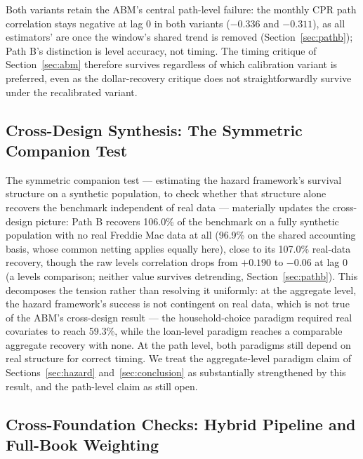 \documentclass[12pt]{article}
\begin{document}
Both variants retain the ABM's central path-level failure: the monthly CPR path correlation stays negative at lag 0 in both variants ($-0.336$ and $-0.311$), as all estimators' are once the window's shared trend is removed (Section~\ref{sec:pathb}); Path B's distinction is level accuracy, not timing. The timing critique of Section~\ref{sec:abm} therefore survives regardless of which calibration variant is preferred, even as the dollar-recovery critique does not straightforwardly survive under the recalibrated variant.

\subsection{Cross-Design Synthesis: The Symmetric Companion Test}\label{sec:robustness-synthesis}

The symmetric companion test --- estimating the hazard framework's survival structure on a synthetic population, to check whether that structure alone recovers the benchmark independent of real data --- materially updates the cross-design picture: Path B recovers 106.0\% of the benchmark on a fully synthetic population with no real Freddie Mac data at all (96.9\% on the shared accounting basis, whose common netting applies equally here), close to its 107.0\% real-data recovery, though the raw levels correlation drops from $+0.190$ to $-0.06$ at lag 0 (a levels comparison; neither value survives detrending, Section~\ref{sec:pathb}). This decomposes the tension rather than resolving it uniformly: at the aggregate level, the hazard framework's success is not contingent on real data, which is not true of the ABM's cross-design result --- the household-choice paradigm required real covariates to reach 59.3\%, while the loan-level paradigm reaches a comparable aggregate recovery with none. At the path level, both paradigms still depend on real structure for correct timing. We treat the aggregate-level paradigm claim of Sections~\ref{sec:hazard} and~\ref{sec:conclusion} as substantially strengthened by this result, and the path-level claim as still open.

\subsection{Cross-Foundation Checks: Hybrid Pipeline and Full-Book Weighting}\label{sec:robustness-hybrid}
\end{document}
